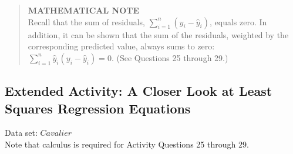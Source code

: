 \documentclass[
]{report}
\begin{document}
\begin{quote}
\textbf{MATHEMATICAL NOTE}\\
Recall that the sum of residuals, \(\sum_{i=1}^n (y_i - \hat{y}_i)\), equals zero. In addition, it can be shown that the sum of the residuals, weighted by the corresponding predicted value, always sums to zero: \(\sum_{i=1}^n \hat{y}_i (y_i - \hat{y}_i) = 0.\) (See Questions 25 through 29.)
\end{quote}

\hypertarget{extended-activity-a-closer-look-at-least-squares-regression-equations}{%
\subsection*{Extended Activity: A Closer Look at Least Squares Regression Equations}\label{extended-activity-a-closer-look-at-least-squares-regression-equations}}

Data set: \(Cavalier\)\\
Note that calculus is required for Activity Questions 25 through 29.
\end{document}
